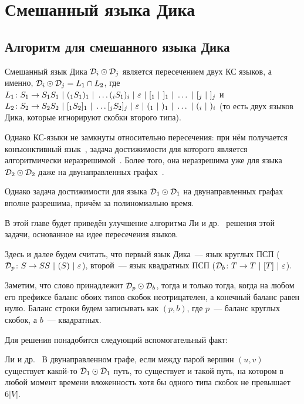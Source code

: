 \section{Смешанный языка Дика}\label{section:dyck_1_1}

\subsection{Алгоритм для смешанного языка Дика}

Смешанный язык Дика $\mathcal{D}_i \odot \mathcal{D}_j$ является пересечением двух КС языков, а именно, 
$\mathcal{D}_i \odot \mathcal{D}_j = L_1 \cap L_2$, где 
$L_1 \colon S_1 \rightarrow S_1 S_1~|~(_1 S_1 )_1~|~ \dots (_i S_1 )_i ~|~ \varepsilon ~|~ [_1 ~|~ ]_1 ~|~ \dots ~|~ [_j ~|~ ]_j$ и 
$L_2 \colon S_2 \rightarrow S_2 S_2~|~[_1 S_2 ]_1~|~ \dots [_j S_2 ]_j ~|~ \varepsilon ~|~ (_1 ~|~ )_1 ~|~ \dots ~|~ (_i ~|~ )_i$ 
(то есть двух языков Дика, которые игнорируют скобки второго типа). 

Однако КС-языки не замкнуты относительно пересечения: при нём получается конъюнктивный язык~\cite{Okhotin01}, задача достижимости для которого является алгоритмически неразрешимой~\cite{Hellings14}. Более того, она неразрешима уже для языка $\mathcal{D}_2 \odot \mathcal{D}_2$ даже на двунаправленных графах~\cite{Li21}. 

Однако задача достижимости для языка $\mathcal{D}_1 \odot \mathcal{D}_1$ на двунаправленных графах вполне разрешима, причём за полиномиально время.

В этой главе будет приведён улучшение алгоритма Ли и др.~\cite{Li21} решения этой задачи, основанное на идее пересечения языков.

\begin{note}\label{fact:intersection}

  Здесь и далее будем считать, что первый язык Дика~--- язык круглых ПСП ($\mathcal{D}_p \colon S \rightarrow SS~|~(S)~|~\varepsilon$), второй~--- язык квадратных ПСП ($\mathcal{D}_b \colon T \rightarrow T~|~[T]~|~\varepsilon$).
\end{note}

Заметим, что слово принадлежит $\mathcal{D}_p \odot \mathcal{D}_b$, тогда и только тогда, когда на любом его префиксе баланс обоих типов скобок неотрицателен, а конечный баланс равен нулю. Баланс строки будем записывать как $(p, b)$, где $p$~--- баланс круглых скобок, а $b$~--- квадратных.

Для решения понадобится следующий вспомогательный факт:

\begin{lemma}{Ли и др.~\cite{Li21}}\label{lm:dyck_6v}
  В двунаправленном графе, если между парой вершин $(u, v)$ существует какой-то $\mathcal{D}_1 \odot \mathcal{D}_1$ путь, то существует и такой путь, на котором в любой момент времени вложенность хотя бы одного типа скобок не превышает $6 |V|$.
\end{lemma}

